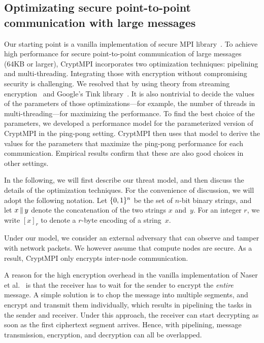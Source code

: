 \subsection{Optimizating secure point-to-point communication with large messages}

Our starting point is a vanilla implementation of secure MPI
library~\cite{Cluster:Naser19}. To achieve high performance for secure
point-to-point communication of large messages (64KB or larger),
CryptMPI incorporates two optimization techniques: 
pipelining and multi-threading. Integrating those with encryption without
compromising security is challenging. We resolved that by using theory from
streaming encryption~\cite{C:HRRV15} and Google's Tink library~\cite{tink}.
It is also nontrivial to decide the values of the parameters of those
optimizations---for example, the number of threads in multi-threading---for
maximizing the performance. To find the best choice of the parameters, we
developed a performance model for the parameterized version of CryptMPI in the
ping-pong setting.
CryptMPI then uses that model to derive the values for the parameters that
maximize the ping-pong performance for each communication.
Empirical results confirm that these are also good choices in
other settings.

In the following, we will first describe our threat model,
and then discuss the details of the optimization techniques.
For the convenience of discussion,
we will adopt the following notation.
Let $\{0,1\}^n$ be the set of $n$-bit binary strings,
and let $x {\,\|\,} y$
denote the concatenation of the two strings $x$ and~$y$.
For an integer $r$, we write $[x]_r$ to denote a $r$-byte encoding
of a string~$x$.

Under our model, we consider an external
adversary that can observe and tamper with network packets.
We however assume that compute nodes are secure.
As a result, CryptMPI only encrypts inter-node communication.

A reason for the high encryption overhead in the vanilla
implementation of Naser et al.~\cite{Cluster:Naser19}
is that the receiver has to wait for the sender to
encrypt the \emph{entire} message. A simple solution is to chop the
message into multiple segments, and encrypt and transmit them individually, which
results in pipelining the tasks in  the sender and receiver.
Under this approach, the receiver can start decrypting as soon as the
first ciphertext segment arrives. Hence, with pipelining, message transmission,
encryption, and decryption can all be overlapped.

